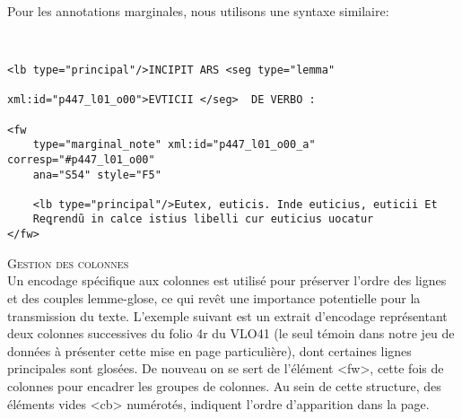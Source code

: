 \documentclass[a4paper, twoside, 12pt]{book}
\begin{document}
Pour les annotations marginales, nous utilisons une syntaxe similaire: \\

\begin{verbatim} 


<lb type="principal"/>INCIPIT ARS <seg type="lemma" 

xml:id="p447_l01_o00">EVTICII </seg>  DE VERBO :
             
<fw 
    type="marginal_note" xml:id="p447_l01_o00_a" corresp="#p447_l01_o00"
    ana="S54" style="F5"
             
    <lb type="principal"/>Eutex, euticis. Inde euticius, euticii Et 
    Reꝗrendũ in calce istius libelli cur euticius uocatur 
</fw>
\end{verbatim}


\textsc{Gestion des colonnes}\\

Un encodage spécifique aux colonnes est utilisé pour préserver l'ordre des lignes et des couples lemme-glose, ce qui revêt une importance potentielle pour la transmission du texte. L'exemple suivant est un extrait d'encodage représentant deux colonnes successives du folio 4r du VLO41 (le seul témoin dans notre jeu de données à présenter cette mise en page particulière), dont certaines lignes principales sont glosées. De nouveau on se sert de l'élément <fw>, cette fois de \@type \og{}colonnes\fg{} pour encadrer les groupes de colonnes. Au sein de cette structure, des éléments vides <cb> numérotés, indiquent l'ordre d'apparition dans la page. \\
\end{document}
